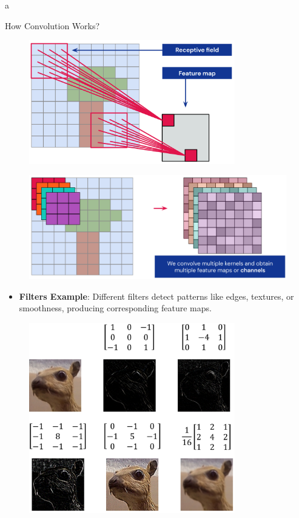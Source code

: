 a\documentclass[10pt]{beamer}
\theoremstyle{remark}
\theoremstyle{definition}
\begin{document}
\begin{frame}[allowframebreaks]{How Convolution Works?}
\begin{figure}
\centering
\includegraphics[width=0.8\textwidth,height=0.8\textheight,keepaspectratio]{./images/conv_10.png}
\end{figure}

\framebreak

\begin{figure}
\centering
\includegraphics[width=1.0\textwidth,height=0.9\textheight,keepaspectratio]{./images/conv_11.png}
\end{figure}

\framebreak

\begin{itemize}
\item \textbf{Filters Example}: Different filters detect patterns like edges, textures, or smoothness, producing corresponding feature maps.
\end{itemize}

\begin{figure}
\centering
\includegraphics[width=0.8\textwidth,height=0.8\textheight,keepaspectratio]{./images/conv_12.png}
\end{figure}


\end{frame}
\end{document}
